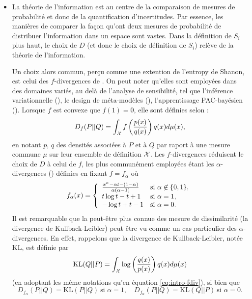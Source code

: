 \begin{itemize}
    \item La théorie de l'information est au centre de la comparaison de mesures de probabilité et donc de la quantification d'incertitudes. Par essence, les manières de comparer la façon qu'ont deux mesures de probabilité de  distribuer l'information dans un espace sont vastes. 
    Dans la définition de $S_i$ plus haut, le choix de $D$ (et donc le choix de définition de $S_i$) relève de la théorie de l'information.
    
    
    Un choix alors commun, perçu comme une extention de l'entropy de Shanon, est celui des $f$-divergences de \citet{csiszar_information-type_1967}. On peut noter qu'elles sont employées dans des domaines variés, au delà de l'analyse de sensibilité, tel que l'inférence variationnelle (\cite{minka_divergence_2005,bach_sum--squares_2023}), le design de méta-modèles (\cite{nguyen_surrogate_2009}), l'apprentissage PAC-bayésien (\cite{picard-weibel_change_2022}).
    Lorsque $f$ est convexe que $f(1)=0$, elle sont définies selon :
        \begin{equation}\label{eq:intro-fdiv}
            D_f(P||Q) = \int_{\mathcal{X}} f\left( \frac{p(x)}{q(x)} \right) q(x)d\mu(x),
        \end{equation}
    en notant $p$, $q$ des densités associées à $P$ et à $Q$ par raport à une mesure commune $\mu$ sur leur ensemble de définition $\mathcal{X}$.     
    Les $f$-divergences réduisent le choix de $D$ à celui de $f$, les plus communément employées étant les $\alpha$-divergences (\cite{zhu_information_1995}) définies en fixant $f=f_\alpha$ où
        \begin{equation}
            f_\alpha(x) = \left\lbrace\begin{array}{l l} \frac{x^\alpha-\alpha t-(1-\alpha)}{\alpha(\alpha-1)} & \text{si\ }\alpha\not\in\{0,1\},\\ 
                t\log t-t+1  & \text{si\ }\alpha=1, \\
                -\log t +t -1 & \text{si\ }\alpha=0.
            \end{array}\right. 
        \end{equation}    
    Il est remarquable que la peut-être plus connue des mesure de dissimilarité (la divergence de Kullback-Leibler) peut être vu comme un cas particulier des $\alpha$-divergences. En effet, rappelons que la divergence de Kullback-Leibler, notée $\text{KL}$, est définie par 
        \begin{equation}
            \text{KL}(Q||P) = \int_{\mathcal{X}}\log\left(\frac{q(x)}{p(x)}\right)q(x)d\mu(x)
        \end{equation}
        (en adoptant les même notations qu'en équation \eqref{eq:intro-fdiv}), si bien que 
        \begin{equation}
            D_{f_\alpha}(P||Q) = \text{KL}(P||Q)\ \text{si\ }\alpha=1,\quad D_{f_\alpha}(P||Q) = \text{KL}(Q||P)\ \text{si\ }\alpha=0.
        \end{equation}


\end{itemize}
